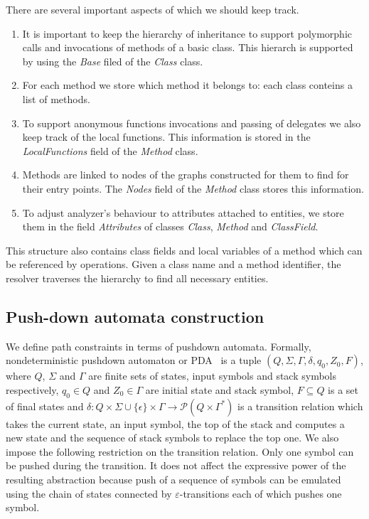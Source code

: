 There are several important aspects of which we should keep track.
\begin{enumerate}
 \item It is important to keep the hierarchy of inheritance to support polymorphic calls and invocations of methods of a basic class.
 This hierarch is supported by using the \textit{Base} filed of the \textit{Class} class.
 \item For each method we store which method it belongs to: each class conteins a list of methods.
 \item To support anonymous functions invocations and passing of delegates we also keep track of the local functions.
 This information is stored in the \textit{LocalFunctions} field of the \textit{Method} class.
 \item Methods are linked to nodes of the graphs constructed for them to find for their entry points.
 The \textit{Nodes} field of the \textit{Method} class stores this information.
 \item To adjust analyzer's behaviour to attributes attached to entities, we store them in the field \textit{Attributes} of classes \textit{Class}, \textit{Method} and \textit{ClassField}.
\end{enumerate}
This structure also contains class fields and local variables of a method which can be referenced by operations.
Given a class name and a method identifier, the resolver traverses the hierarchy to find all necessary entities.

\subsection{Push-down automata construction}

We define path constraints in terms of pushdown automata.
Formally, nondeterministic pushdown automaton or PDA~\cite{AutomataTheory} is a tuple $(Q, \Sigma, \Gamma, \delta, q_0, Z_0, F)$, where $Q$, $\Sigma$ and $\Gamma$ are finite sets of states, input symbols and stack symbols respectively, $q_0 \in Q$ and $Z_0 \in \Gamma$ are initial state and stack symbol, $F \subseteq Q$ is a set of final states and $\delta: Q \times \Sigma \cup \{\epsilon\} \times \Gamma \rightarrow \mathcal P (Q \times \Gamma^*)$ is a transition relation which takes the current state, an input symbol, the top of the stack and computes a new state and the sequence of stack symbols to replace the top one.
We also impose the following restriction on the transition relation.
Only one symbol can be pushed during the transition.
It does not affect the expressive power of the resulting abstraction because push of a sequence of symbols can be emulated using the chain of states connected by $\varepsilon$-transitions each of which pushes one symbol.

